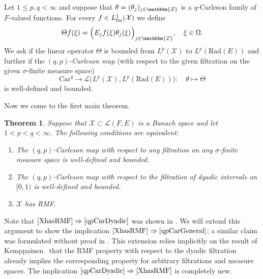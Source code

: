 \documentclass[a4paper,10pt]{amsart}
\theoremstyle{plain}
\newtheorem{theorem}{Theorem}
\theoremstyle{definition}
\theoremstyle{remark}
\begin{document}
Let $1 \leq p,q < \infty$ and suppose that $\theta = (\theta_j)_{j\in{\mathbbm{Z}}}$ is a $q$-Carleson family of $F$-valued functions.
For every $f\in L_{\textup{fin}}^1(\mathcal{X})$ we define
\begin{equation*}
  \Theta f(\xi) = \Big( E_jf(\xi)\theta_j(\xi) \Big)_{j\in{\mathbbm{Z}}} , \quad \xi\in\Omega .
\end{equation*}
We ask if the linear operator $\Theta$ is bounded from $L^p(\mathcal{X})$ to $L^p(\text{Rad}(E))$ and further if
the \emph{$(q,p)$-Carleson map} (with respect to the given filtration on the given $\sigma$-finite measure space)
\begin{equation*}
  \text{Car}^q \to \mathcal{L}\Big( L^p(\mathcal{X}) , L^p(\text{Rad}(E)) \Big) : \quad \theta \mapsto \Theta
\end{equation*}
is well-defined and bounded.

Now we come to the first main theorem.

\begin{theorem}
\label{mainthm1}
  Suppose that $\mathcal{X}\subset\mathcal{L}(F,E)$ is a Banach space 
  and let $1 < p < q < \infty$. The following conditions are equivalent:
  \begin{enumerate}
    \item\label{qpCarGeneral} The $(q,p)$-Carleson map 
          with respect to any filtration on any $\sigma$-finite measure space is well-defined and bounded.
    \item\label{qpCarDyadic} The $(q,p)$-Carleson map 
          with respect to the filtration of dyadic intervals on $[0,1)$ is well-defined and bounded.
    \item\label{XhasRMF} $\mathcal{X}$ has RMF.
  \end{enumerate}
\end{theorem}  

Note that $\eqref{XhasRMF}\Rightarrow\eqref{qpCarDyadic}$ was shown in \cite{HMP}. We will extend this argument to show the implication $\eqref{XhasRMF}\Rightarrow\eqref{qpCarGeneral}$; a similar claim was formulated without proof in \cite{HYTONENNONHOMTB}. This extension relies implicitly on the result of Kemppainen~\cite{RMF} that the RMF property with respect to the dyadic filtration already implies the corresponding property for arbitrary filtrations and measure spaces. The implication $\eqref{qpCarDyadic}\Rightarrow\eqref{XhasRMF}$ is completely new.
  
\end{document}
